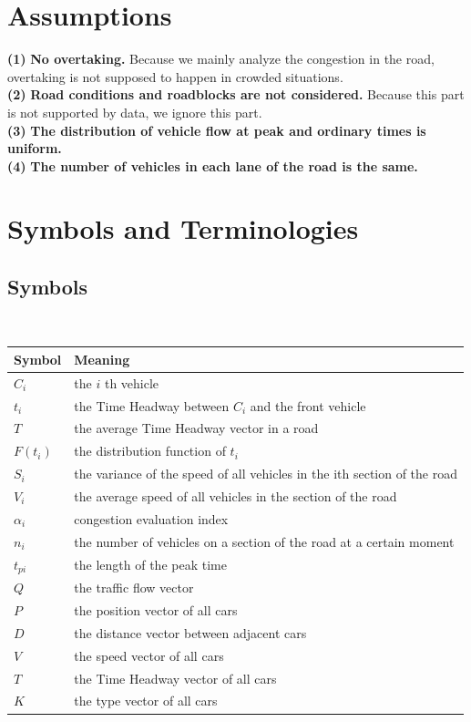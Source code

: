 \documentclass[UTF8]{mcmthesis}
\begin{document}
\section{Assumptions}%
\noindent
{\bf (1) } \textbf{No overtaking.} Because we mainly analyze the congestion in the road, overtaking is not supposed to happen in crowded situations.\\
{\bf (2) } \textbf{Road conditions and roadblocks are not considered.} Because this part is not supported by data, we ignore this part.\\
{\bf (3) } \textbf{The distribution of vehicle flow at peak and ordinary times is uniform.}\\
{\bf (4) } \textbf{The number of vehicles in each lane of the road is the same.}
\section{Symbols and Terminologies}
\subsection{Symbols}
\begin{table}[H]
        \setlength{\abovecaptionskip}{0pt}
        \setlength{\belowcaptionskip}{0pt}
         \\
        \begin{tabular}{p{1.8cm}|p{12cm}}
        \hline
        \rowcolor[gray]{0.9}\bf{Symbol} &\bf{Meaning}\\
        \hline
        $C_{i}$	 &the $i$ th vehicle\\
        $t_{i}$	&the Time Headway between $ C_{i} $ and the front vehicle\\
        $T$	&the average Time Headway vector in a road\\
        $F(t_{i})$ &the distribution function of $t_{i}$\\
		$S_{i}$	&the variance of the speed of all vehicles in the ith section of the road \\    
		$V_{i}$	&the average speed of all vehicles in the section of the road  \\
		$\alpha_{i}$ &congestion evaluation index \\
		$n_i$ &the number of vehicles on a section of the road at a certain moment\\
		$t_{pi}$ &the length of the peak time \\
		$Q$ &the traffic flow vector\\
		$P$ &the position vector of all cars\\
		$D$ &the distance vector between adjacent cars\\
		$V$ &the speed vector of all cars\\
		$T$ &the Time Headway vector of all cars\\
		$K$ &the type vector of all cars
        \end{tabular}
        \end{table}
\end{document}

